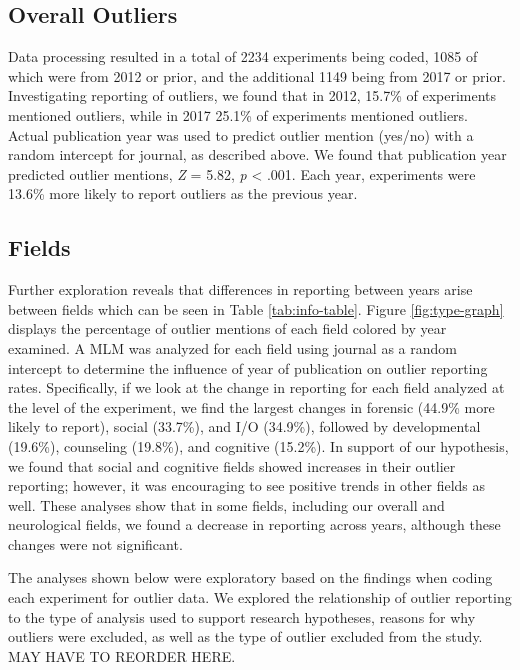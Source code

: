 \documentclass[english,man]{apa6}
\theoremstyle{definition}
\theoremstyle{definition}
\theoremstyle{definition}
\theoremstyle{remark}
\begin{document}
\subsection{Overall Outliers}\label{overall-outliers}

Data processing resulted in a total of 2234 experiments being coded,
1085 of which were from 2012 or prior, and the additional 1149 being
from 2017 or prior. Investigating reporting of outliers, we found that
in 2012, 15.7\% of experiments mentioned outliers, while in 2017 25.1\%
of experiments mentioned outliers. Actual publication year was used to
predict outlier mention (yes/no) with a random intercept for journal, as
described above. We found that publication year predicted outlier
mentions, \emph{Z} = 5.82, \emph{p} \textless{} .001. Each year,
experiments were 13.6\% more likely to report outliers as the previous
year.

\subsection{Fields}\label{fields-1}

Further exploration reveals that differences in reporting between years
arise between fields which can be seen in Table \ref{tab:info-table}.
Figure \ref{fig:type-graph} displays the percentage of outlier mentions
of each field colored by year examined. A MLM was analyzed for each
field using journal as a random intercept to determine the influence of
year of publication on outlier reporting rates. Specifically, if we look
at the change in reporting for each field analyzed at the level of the
experiment, we find the largest changes in forensic (44.9\% more likely
to report), social (33.7\%), and I/O (34.9\%), followed by developmental
(19.6\%), counseling (19.8\%), and cognitive (15.2\%). In support of our
hypothesis, we found that social and cognitive fields showed increases
in their outlier reporting; however, it was encouraging to see positive
trends in other fields as well. These analyses show that in some fields,
including our overall and neurological fields, we found a decrease in
reporting across years, although these changes were not significant.

The analyses shown below were exploratory based on the findings when
coding each experiment for outlier data. We explored the relationship of
outlier reporting to the type of analysis used to support research
hypotheses, reasons for why outliers were excluded, as well as the type
of outlier excluded from the study. MAY HAVE TO REORDER HERE.
\end{document}
